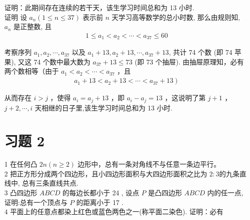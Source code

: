 \documentclass[10pt]{article}
\begin{document}
证明：此期间存在连续的若干天，该生学习时间总和为 13 小时.\\
证明 设 $a_{n}(1 \leqslant n \leqslant 37)$ 表示前 $n$ 天学习高等数学的总小时数, 那么由规则知, $a_{n}$ 是正整数, 且\\
\begin{align*}
1 \leqslant a_{1}<a_{2}<\cdots<a_{37} \leqslant 60
\end{align*}

考察序列 $a_{1}, a_{2}, \cdots, a_{37}$ 以及 $a_{1}+13, a_{2}+13, \cdots, a_{37}+13$, 共计 74 个数 (即 74 苹果), 又这 74 个数中最大数为 $a_{37}+13 \leqslant 73$ (即 73 个抽屉). 由抽屉原理知，必有两个数相等（由于 $a_{1}<a_{2}<\cdots<a_{37}$ ，且\\
\begin{align*}
\left.a_{1}+13<a_{2}+13<\cdots<a_{37}+13\right)
\end{align*}

从而存在 $i>j$ ，使得 $a_{i}=a_{j}+13$ ，即 $a_{i}-a_{j}=13$ ，这说明了第 $j+1$ ， $j+2, \cdots, i$ 天相继的日子里,该生学习时间总和为 13 小时.

\section{习题 2}
1 在任何凸 $2 n(n \geqslant 2)$ 边形中，总有一条对角线不与任意一条边平行。\\
2 把正方形分成两个四边形，且小四边形面积与大四边形面积之比为 $2: 3$的九条直线中, 总有三条直线共点.\\
3 凸四边形 $A B C D$ 的每边长都小于 24 , 设点 $P$ 是凸四边形 $A B C D$ 内的任一点,证明:总有一个顶点与 $P$ 的距离小于 17 .\\
4 平面上的任意点都染上红色或蓝色两色之一(称平面二染色). 证明：必有
\end{document}
